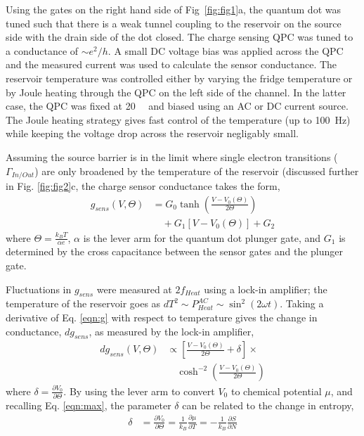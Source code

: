 \documentclass[twocolumn,showpacs,preprintnumbers,amsmath,amssymb,pra,aps,superscriptaddress]{revtex4-1}
\begin{document}
Using the gates on the right hand side of Fig~\ref{fig:fig1}a, the quantum dot was tuned such that there is a weak tunnel coupling to the reservoir on the source side with the drain side of the dot closed. The charge sensing QPC was tuned to a conductance of ${\sim}e^2/h$. A small DC voltage bias was applied across the QPC and the measured current was used to calculate the sensor conductance. The reservoir temperature was controlled either by varying the fridge temperature or by Joule heating through the QPC on the left side of the channel. In the latter case, the QPC was fixed at \SI{20}{\kilo\ohms} and biased using an AC or DC current source. The Joule heating strategy gives fast control of the temperature (up to \SI{100}{\hertz}) while keeping the voltage drop across the reservoir negligably small.

Assuming the source barrier is in the limit where single electron transitions ($\Gamma_{In/Out}$) are only broadened by the temperature of the reservoir (discussed further in Fig. \ref{fig:fig2}c, the charge sensor conductance takes the form,
%
\begin{align}
\label{eqn:g}
        g_{sens}(V,\Theta) &= G_0 \tanh\left(\frac{V-V_0(\Theta)}{2\Theta}\right)  \\
                        &\quad + G_1\left[V-V_0(\Theta)\right] + G_2 \nonumber
\end{align}
%
where $\Theta = \frac{k_B T}{\alpha e}$, $\alpha$ is the lever arm for the quantum dot plunger gate, and $G_1$ is determined by the cross capacitance between the sensor gates and the plunger gate.

Fluctuations in $g_{sens}$ were measured at $2f_{Heat}$ using a lock-in amplifier; the temperature of the reservoir goes as $dT^2 \sim P^{AC}_{Heat} \sim \sin^2(2\omega t)$. Taking a derivative of Eq. \ref{eqn:g} with respect to temperature gives the change in conductance, $dg_{sens}$, as measured by the lock-in amplifier,
%
\begin{align}
\label{eqn:dg}
        dg_{sens}(V, \Theta) &\propto \left[ \frac{V-V_0(\Theta)}{2\Theta} + \delta \right]\times \\
        				      &\quad\cosh^{-2}\left(\frac{V-V_0(\Theta)}{2\Theta}\right) \nonumber
\end{align}
%
where $\delta=\frac{\partial V_0}{\partial \Theta}$. By using the lever arm to convert $V_0$ to chemical potential $\mu$, and recalling Eq. \ref{eqn:max}, the parameter $\delta$ can be related to the change in entropy,
%
\begin{align}
\label{eqn:delta}
        \delta &= \frac{\partial V_0}{\partial \Theta} = 
        \frac{1}{k_B} \frac{\partial \mu}{\partial T} = 
        -\frac{1}{k_B} \frac{\partial S}{\partial N}
\end{align}
%
\end{document}
